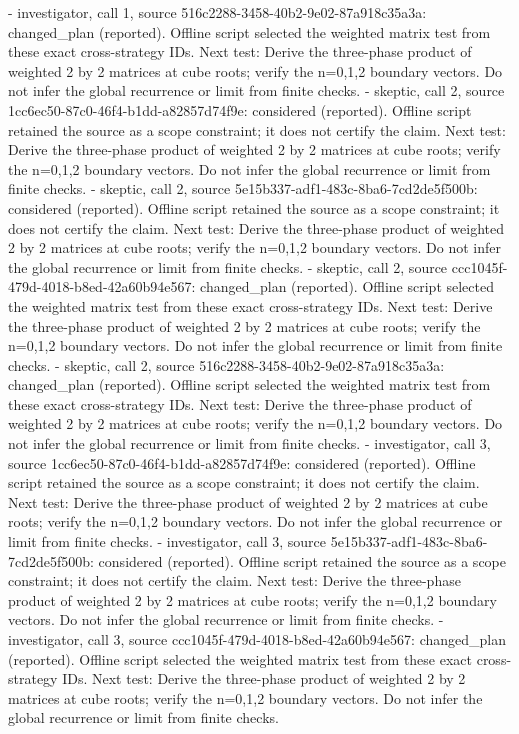 \documentclass[11pt]{article}
\begin{document}
- investigator, call 1, source 516c2288-3458-40b2-9e02-87a918c35a3a: changed\_plan (reported). Offline script selected the weighted matrix test from these exact cross-strategy IDs. Next test: Derive the three-phase product of weighted 2 by 2 matrices at cube roots; verify the n=0,1,2 boundary vectors. Do not infer the global recurrence or limit from finite checks.
- skeptic, call 2, source 1cc6ec50-87c0-46f4-b1dd-a82857d74f9e: considered (reported). Offline script retained the source as a scope constraint; it does not certify the claim. Next test: Derive the three-phase product of weighted 2 by 2 matrices at cube roots; verify the n=0,1,2 boundary vectors. Do not infer the global recurrence or limit from finite checks.
- skeptic, call 2, source 5e15b337-adf1-483c-8ba6-7cd2de5f500b: considered (reported). Offline script retained the source as a scope constraint; it does not certify the claim. Next test: Derive the three-phase product of weighted 2 by 2 matrices at cube roots; verify the n=0,1,2 boundary vectors. Do not infer the global recurrence or limit from finite checks.
- skeptic, call 2, source ccc1045f-479d-4018-b8ed-42a60b94e567: changed\_plan (reported). Offline script selected the weighted matrix test from these exact cross-strategy IDs. Next test: Derive the three-phase product of weighted 2 by 2 matrices at cube roots; verify the n=0,1,2 boundary vectors. Do not infer the global recurrence or limit from finite checks.
- skeptic, call 2, source 516c2288-3458-40b2-9e02-87a918c35a3a: changed\_plan (reported). Offline script selected the weighted matrix test from these exact cross-strategy IDs. Next test: Derive the three-phase product of weighted 2 by 2 matrices at cube roots; verify the n=0,1,2 boundary vectors. Do not infer the global recurrence or limit from finite checks.
- investigator, call 3, source 1cc6ec50-87c0-46f4-b1dd-a82857d74f9e: considered (reported). Offline script retained the source as a scope constraint; it does not certify the claim. Next test: Derive the three-phase product of weighted 2 by 2 matrices at cube roots; verify the n=0,1,2 boundary vectors. Do not infer the global recurrence or limit from finite checks.
- investigator, call 3, source 5e15b337-adf1-483c-8ba6-7cd2de5f500b: considered (reported). Offline script retained the source as a scope constraint; it does not certify the claim. Next test: Derive the three-phase product of weighted 2 by 2 matrices at cube roots; verify the n=0,1,2 boundary vectors. Do not infer the global recurrence or limit from finite checks.
- investigator, call 3, source ccc1045f-479d-4018-b8ed-42a60b94e567: changed\_plan (reported). Offline script selected the weighted matrix test from these exact cross-strategy IDs. Next test: Derive the three-phase product of weighted 2 by 2 matrices at cube roots; verify the n=0,1,2 boundary vectors. Do not infer the global recurrence or limit from finite checks.
\end{document}
